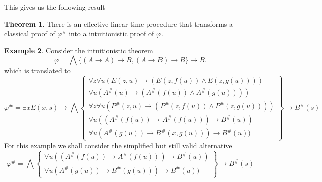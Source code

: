 \documentclass[a4paper,11pt]{report}
\theoremstyle{definition}
\newtheorem{theorem}{Theorem}[section]
\theoremstyle{definition}
\theoremstyle{definition}
\theoremstyle{definition}
\theoremstyle{definition}
\theoremstyle{definition}
\newtheorem{example}[theorem]{Example}
\theoremstyle{definition}
\begin{document}
	This gives us the following result
	\begin{theorem}
		There is an effective linear time procedure that transforms a classical proof of $\varphi^\#$ into a intuitionistic proof of $\varphi$.
	\end{theorem}
	\begin{example}
		Consider the intuitionistic theorem $$\varphi = \bigwedge\{(A\to A)\to B, (A\to B)\to B\}\to B.$$
		which is translated to
		\[
			\varphi^\# = \exists xE(x, s)\to \bigwedge\left\lbrace
			\begin{matrix}
				\forall z\forall u(E(z, u)\to (E(z, f(u))\wedge E(z, g(u))))\\
				\forall u(A^\#(u)\to  (A^\#(f(u))\wedge A^\#(g(u))))\\
				\forall z\forall u(P^\#(z, u)\to (P^\#(z, f(u))\wedge P^\#(z, g(u))))\\
				\forall u((A^\#(f(u))\to A^\#(f(u)))\to B^\#(u))\\
				\forall u(A^\#(g(u))\to B^\#(x, g(u)))\to B^\#(u))
			\end{matrix}\right\rbrace 
			\to B^\#(s)
		\]
			For this example we shall consider the simplified but still valid alternative
			\[
			\varphi^\# = \bigwedge\left\lbrace
			\begin{matrix}
				\forall u((A^\#(f(u))\to A^\#(f(u)))\to B^\#(u))\\
				\forall u(A^\#(g(u))\to B^\#(g(u)))\to B^\#(u))
			\end{matrix}\right\rbrace 
			\to B^\#(s)
			\]
			

\end{example}
\end{document}
